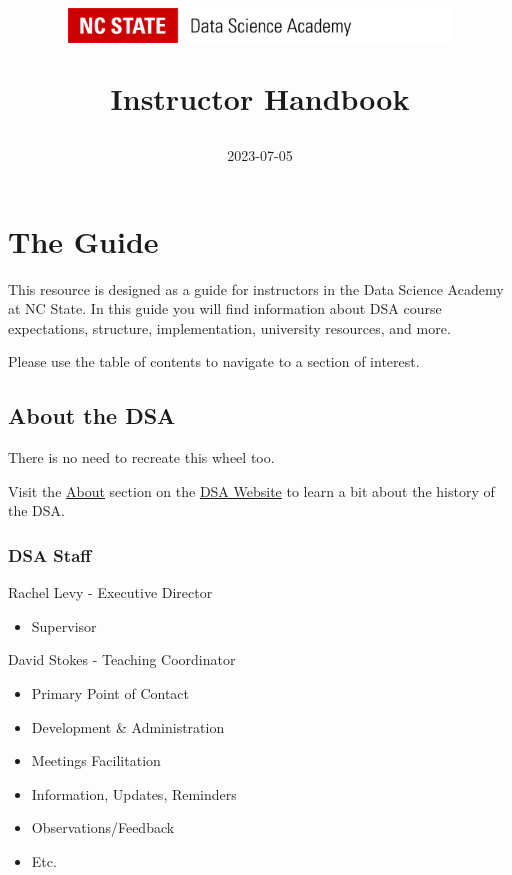 \documentclass[
]{book}
\title{\includegraphics[width=4in,height=\textheight]{DSA Logo.png}

Instructor Handbook}
\author{2023-07-05}
\date{}
\providecommand{\tightlist}{%
  \setlength{\itemsep}{0pt}\setlength{\parskip}{0pt}}
\begin{document}
\maketitle

{
\setcounter{tocdepth}{1}
\tableofcontents
}
\hypertarget{the-guide}{%
\chapter{The Guide}\label{the-guide}}

This resource is designed as a guide for instructors in the Data Science Academy at NC State. In this guide you will find information about DSA course expectations, structure, implementation, university resources, and more.

Please use the table of contents to navigate to a section of interest.

\hypertarget{about-the-dsa}{%
\section{About the DSA}\label{about-the-dsa}}

There is no need to recreate this wheel too.

Visit the \href{https://datascienceacademy.ncsu.edu/about/}{About} section on the \href{https://datascienceacademy.ncsu.edu/}{DSA Website} to learn a bit about the history of the DSA.

\hypertarget{dsa-staff}{%
\subsection{DSA Staff}\label{dsa-staff}}

Rachel Levy - Executive Director

\begin{itemize}
\tightlist
\item
  Supervisor
\end{itemize}

David Stokes - Teaching Coordinator

\begin{itemize}
\tightlist
\item
  Primary Point of Contact
\item
  Development \& Administration
\item
  Meetings Facilitation
\item
  Information, Updates, Reminders
\item
  Observations/Feedback
\item
  Etc.
\end{itemize}
\end{document}
